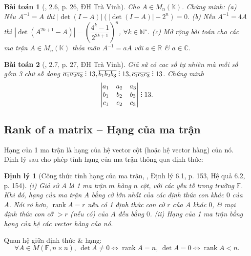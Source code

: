 \documentclass{article}
\newtheorem{baitoan}{Bài toán}
\newtheorem{dinhly}{Định lý}
\DeclareRobustCommand{\divby}{%
	\mathrel{\vbox{\baselineskip.65ex\lineskiplimit0pt\hbox{.}\hbox{.}\hbox{.}}}%
}
\begin{document}
\begin{baitoan}[\cite{VMS_VMC2024}, 2.6, p. 26, ĐH Trà Vinh]
	Cho $A\in M_n(\mathbb{K})$. Chứng minh: (a) Nếu $A^{-1} = A$ thì $|\det(I - A)|(|\det(I - A)| - 2^n) = 0$. (b) Nếu $A^{-1} = 4A$ thì $|\det(A^{2k+1} - A)| = \left(\dfrac{4^k - 1}{2^{2k + 1}}\right)^n$, $\forall k\in\mathbb{N}^\star$. (c) Mở rộng bài toán cho các ma trận $A\in M_n(\mathbb{K})$ thỏa mãn $A^{-1} = aA$ với $a\in\mathbb{R}$ \& $a\in\mathbb{C}$.
\end{baitoan}

\begin{baitoan}[\cite{VMS_VMC2024}, 2.7, p. 27, ĐH Trà Vinh]
	Giả sử có cac số tự nhiên mà mỗi số gồm 3 chữ số dạng $\overline{a_1a_2a_3}\divby13,\overline{b_1b_2b_3}\divby13,\overline{c_1c_2c_3}\divby13$. Chứng minh
	\begin{equation*}
		\begin{vmatrix}
			a_1 & a_2 & a_3\\b_1 & b_2 & b_3\\c_1 & c_2 & c_3
		\end{vmatrix}\divby13.
	\end{equation*}
\end{baitoan}


\subsection{Rank of a matrix -- Hạng của ma trận}
Hạng của 1 ma trận là hạng của hệ vector cột (hoặc hệ vector hàng) của nó. Định lý sau cho phép tính hạng của ma trận thông qua định thức:

\begin{dinhly}[Công thức tính hạng của ma trận, \cite{Hung_linear_algebra}, Định lý 6.1, p. 153, Hệ quả 6.2, p. 154]
	(i) Giả sử $A$ là 1 ma trận $m$ hàng $n$ cột, với các yếu tố trong trường $\mathbb{F}$. Khi đó, hạng của ma trận $A$ bằng cỡ lớn nhất của các định thức con khác $0$ của $A$. Nói rõ hơn, $\operatorname{rank}A = r$ nếu có 1 định thức con cỡ $r$ của $A$ khác $0$, \& mọi định thức con cỡ $> r$ (nếu có) của $A$ đều bằng $0$. (ii) Hạng của 1 ma trận bằng hạng của hệ các vector hàng của nó.
\end{dinhly}
Quan hệ giữa định thức \& hạng:
\begin{equation*}
	\forall A\in M(\mathbb{F},n\times n),\ \det A\ne0\Leftrightarrow\operatorname{rank}A = n,\ \det A = 0\Leftrightarrow\operatorname{rank}A < n.
\end{equation*}
\end{document}
